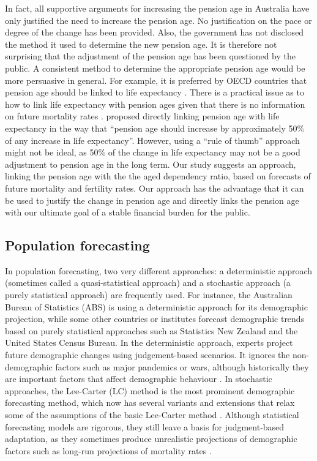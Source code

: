 \documentclass[11pt,a4paper,]{article}
\begin{document}
In fact, all supportive arguments for increasing the pension age in
Australia have only justified the need to increase the pension age. No
justification on the pace or degree of the change has been provided.
Also, the government has not disclosed the method it used to determine
the new pension age. It is therefore not surprising that the adjustment
of the pension age has been questioned by the public. A consistent
method to determine the appropriate pension age would be more persuasive
in general. For example, it is preferred by OECD countries that pension
age should be linked to life expectancy \autocite{OECD12}. There is a
practical issue as to how to link life expectancy with pension ages
given that there is no information on future mortality rates
\autocite{PC13}. \textcite[p7]{CEDA07} proposed directly linking pension
age with life expectancy in the way that ``pension age should increase
by approximately 50\% of any increase in life expectancy''. However,
using a ``rule of thumb'' approach might not be ideal, as 50\% of the
change in life expectancy may not be a good adjustment to pension age in
the long term. Our study suggests an approach, linking the pension age
with the the aged dependency ratio, based on forecasts of future
mortality and fertility rates. Our approach has the advantage that it
can be used to justify the change in pension age and directly links the
pension age with our ultimate goal of a stable financial burden for the
public.

\subsection{Population forecasting}\label{population-forecasting}

In population forecasting, two very different approaches: a
deterministic approach (sometimes called a quasi-statistical approach)
and a stochastic approach (a purely statistical approach) are frequently
used. For instance, the Australian Bureau of Statistics (ABS) is using a
deterministic approach for its demographic projection, while some other
countries or institutes forecast demographic trends based on purely
statistical approaches such as Statistics New Zealand and the United
States Census Bureau. In the deterministic approach, experts project
future demographic changes using judgement-based scenarios. It ignores
the non-demographic factors such as major pandemics or wars, although
historically they are important factors that affect demographic
behaviour \autocite{PC13}. In stochastic approaches, the Lee-Carter (LC)
method \autocite{LC92} is the most prominent demographic forecasting
method, which now has several variants and extensions that relax some of
the assumptions of the basic Lee-Carter method \autocite[see,
e.g.,][]{SBH11}. Although statistical forecasting models are rigorous,
they still leave a basis for judgment-based adaptation, as they
sometimes produce unrealistic projections of demographic factors such as
long-run projections of mortality rates \autocite{PC13}.
\end{document}
